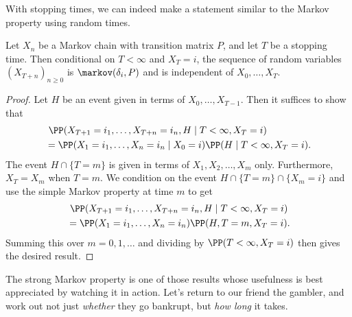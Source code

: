 \documentclass[a4paper]{scrartcl}
\begin{document}
With stopping times, we can indeed make a statement similar to the Markov property using random times.

\begin{theorem}	
Let $X_n$ be a Markov chain with transition matrix $P$, and let $T$ be a stopping time. Then conditional on $T < \infty$ and $X_T = i$, the sequence of random variables $(X_{T + n})_{n \geq 0}$ is $\markov(\delta_i, P)$ and is independent of $X_0, \dots, X_T$.
\end{theorem}
\begin{proof}
Let $H$ be an event given in terms of $X_0, \dots, X_{T - 1}$. Then it suffices to show that
\begin{align*}
	&\ \PP(X_{T + 1} = i_1, \dots, X_{T + n} = i_n, H \mid T < \infty, X_T = i)  \\
	&= \PP(X_1 = i_1, \dots, X_n = i_n \mid X_0 = i) \PP(H \mid T < \infty, X_T = i).
\end{align*}
The event $H \cap \{T = m\}$ is given in terms of $X_1, X_2, \dots, X_m$ only. Furthermore, $X_T = X_m$ when $T = m$. We condition on the event $H \cap \{T = m\} \cap \{X_m = i\}$ and use the simple Markov property at time $m$ to get
\begin{align*}
&\ \PP(X_{T + 1} = i_1, \dots, X_{T + n} = i_n, H \mid T < \infty, X_T = i) \\
&= \PP(X_1 = i_1, \dots, X_n = i_n) \PP(H, T = m, X_T = i).
\end{align*}
Summing this over $m = 0, 1, \dots$ and dividing by $\PP(T < \infty, X_T = i)$ then gives the desired result.
\end{proof}

The strong Markov property is one of those results whose usefulness is best appreciated by watching it in action. Let's return to our friend the gambler, and work out not just \emph{whether} they go bankrupt, but \emph{how long} it takes.
\end{document}
